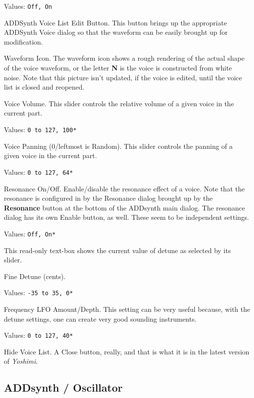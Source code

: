    Values: \texttt{Off, On}

   ADDSynth Voice List Edit Button.
   This button brings up the appropriate ADDSynth Voice dialog so that the
   waveform can be easily brought up for modification.

   Waveform Icon.
   The waveform icon shows a rough rendering of the actual shape of the
   voice waveform, or the letter \textbf{N} is the voice is constructed from
   white noise.  Note that this picture isn't updated, if the voice is
   edited, until the voice list is closed and reopened.

   Voice Volume.
   This slider controls the relative volume of a given voice in the current
   part.

   Values: \texttt{0 to 127, 100*}

   Voice Panning (0/leftmost is Random).
   This slider controls the panning of a given voice in the current part.

   Values: \texttt{0 to 127, 64*}

   Resonance On/Off.
   Enable/disable the resonance effect of a voice.
   Note that the resonance is configured in by the Resonance dialog brought
   up by the \textbf{Resonance} button at the bottom of the ADDsynth main
   dialog.  The resonance dialog has its own Enable button, as well.
   These seem to be independent settings.

   Values: \texttt{Off, On*}

   This read-only text-box shows the current value of detune as selected by
   its slider.

   Fine Detune (cents).

   Values: \texttt{-35 to 35, 0*}

   Frequency LFO Amount/Depth.
   This setting can be very useful because, with the detune settings, one can
   create very good sounding instruments. 

   Values: \texttt{0 to 127, 40*}

   Hide Voice List.  A Close button, really, and that is what it is in the
   latest version of \textsl{Yoshimi}.

\subsection{ADDsynth / Oscillator}
\label{subsec:addsynth_oscillator}

